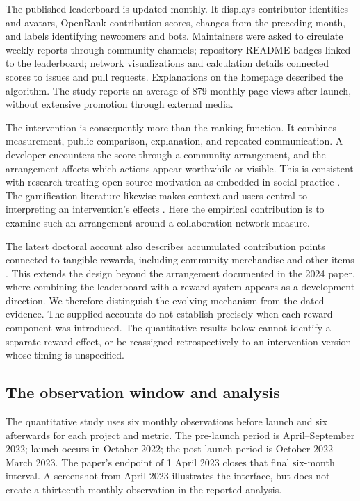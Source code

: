 

The published leaderboard is updated monthly. It displays contributor identities and avatars, OpenRank contribution scores, changes from the preceding month, and labels identifying newcomers and bots. Maintainers were asked to circulate weekly reports through community channels; repository README badges linked to the leaderboard; network visualizations and calculation details connected scores to issues and pull requests. Explanations on the homepage described the algorithm. The study reports an average of 879 monthly page views after launch, without extensive promotion through external media.

The intervention is consequently more than the ranking function. It combines measurement, public comparison, explanation, and repeated communication. A developer encounters the score through a community arrangement, and the arrangement affects which actions appear worthwhile or visible. This is consistent with research treating open source motivation as embedded in social practice \citep{vonkrogh2012}. The gamification literature likewise makes context and users central to interpreting an intervention's effects \citep{hamari2014}. Here the empirical contribution is to examine such an arrangement around a collaboration-network measure.

The latest doctoral account also describes accumulated contribution points connected to tangible rewards, including community merchandise and other items \citep[Section 6.2]{zhao2025thesis}. This extends the design beyond the arrangement documented in the 2024 paper, where combining the leaderboard with a reward system appears as a development direction. We therefore distinguish the evolving mechanism from the dated evidence. The supplied accounts do not establish precisely when each reward component was introduced. The quantitative results below cannot identify a separate reward effect, or be reassigned retrospectively to an intervention version whose timing is unspecified.

\subsection{The observation window and analysis}
The quantitative study uses six monthly observations before launch and six afterwards for each project and metric. The pre-launch period is April--September 2022; launch occurs in October 2022; the post-launch period is October 2022--March 2023. The paper's endpoint of 1 April 2023 closes that final six-month interval. A screenshot from April 2023 illustrates the interface, but does not create a thirteenth monthly observation in the reported analysis.

